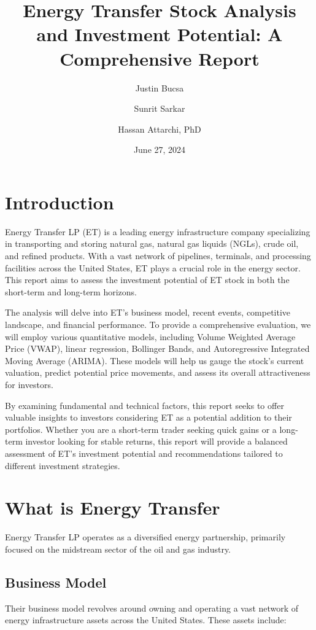 \documentclass[9pt,a4paper,twoside]{tau}
\title{Energy Transfer Stock Analysis and Investment Potential: A Comprehensive Report}
\author[a,1]{Justin Bucsa}
\author[b,2]{Sunrit Sarkar}
\author[b,c,3]{Hassan Attarchi, PhD}
\affil[a]{Stealth}
\affil[b]{Stealth}
\affil[c]{Stealth \& University of California, Riverside}
\date{June 27, 2024}
\begin{document}
		
	\maketitle
	\thispagestyle{firststyle}
	\tauabstract
	\tableofcontents


\section{Introduction}

    Energy Transfer LP (ET) is a leading energy infrastructure company specializing in transporting and storing natural gas, natural gas liquids (NGLs), crude oil, and refined products. With a vast network of pipelines, terminals, and processing facilities across the United States, ET plays a crucial role in the energy sector. This report aims to assess the investment potential of ET stock in both the short-term and long-term horizons.

    The analysis will delve into ET's business model, recent events, competitive landscape, and financial performance. To provide a comprehensive evaluation, we will employ various quantitative models, including Volume Weighted Average Price (VWAP), linear regression, Bollinger Bands, and Autoregressive Integrated Moving Average (ARIMA). These models will help us gauge the stock's current valuation, predict potential price movements, and assess its overall attractiveness for investors.
    
    By examining fundamental and technical factors, this report seeks to offer valuable insights to investors considering ET as a potential addition to their portfolios. Whether you are a short-term trader seeking quick gains or a long-term investor looking for stable returns, this report will provide a balanced assessment of ET's investment potential and recommendations tailored to different investment strategies.


\section{What is Energy Transfer}
    Energy Transfer LP operates as a diversified energy partnership, primarily focused on the midstream sector of the oil and gas industry. 

    \subsection{Business Model}
        Their business model revolves around owning and operating a vast network of energy infrastructure assets across the United States. These assets include:
        
\end{document}
